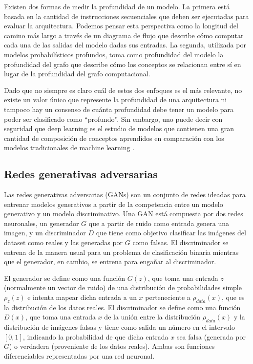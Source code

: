 \documentclass[spanish]{report}
\begin{document}

Existen dos formas de medir la profundidad de un modelo. La primera está basada en la cantidad de instrucciones secuenciales que deben ser ejecutadas para evaluar la arquitectura. Podemos pensar esta perspectiva como la longitud del camino más largo a través de un diagrama de flujo que describe cómo computar cada una de las salidas del modelo dadas sus entradas. La segunda, utilizada por modelos probabilísticos profundos, toma como profundidad del modelo la profundidad del grafo que describe cómo los conceptos se relacionan entre sí en lugar de la profundidad del grafo computacional.

Dado que no siempre es claro cuál de estos dos enfoques es el más relevante, no existe un valor único que represente la profundidad de una arquitectura ni tampoco hay un consenso de cuánta profundidad debe tener un modelo para poder ser clasificado como  ``profundo''. Sin embargo, uno puede decir con seguridad que deep learning es el estudio de modelos que contienen una gran cantidad de composición de conceptos aprendidos en comparación con los modelos tradicionales de machine learning \cite{deep_learning_book}.

\subsection{Redes generativas adversarias}

Las redes generativas adversarias (GANs) \cite{goodfellow_generative_2014} \cite{gan_explanation_web} son un conjunto de redes ideadas para entrenar modelos generativos a partir de la competencia entre un modelo generativo y un modelo discriminativo.  Una GAN está compuesta por dos redes neuronales, un generador $G$ que a partir de ruido como entrada genera una imagen, y un discriminador $D$ que tiene como objetivo clasificar las imágenes del dataset como reales y las generadas por $G$ como falsas. El discriminador se entrena de la manera usual para un problema de clasificación binaria mientras que el generador, en cambio, se entrena para engañar al discriminador.

El generador se define como una función $G(z)$, que toma una entrada $z$ (normalmente un vector de ruido) de una distribución de probabilidades simple $\rho_z(z)$ e intenta mapear dicha entrada a un $x$ perteneciente a $\rho_{data}(x)$, que es la distribución de los datos reales. El discriminador se define como una función $D(x)$, que toma una entrada $x$ de la unión entre la distribución $\rho_{data}(x)$ y la distribución de imágenes falsas y tiene como salida un número en el intervalo $[0, 1]$, indicando la probabilidad de que dicha entrada $x$ sea falsa (generada por $G$) o verdadera (proveniente de los datos reales). Ambas son funciones diferenciables representadas por una red neuronal.
\end{document}
